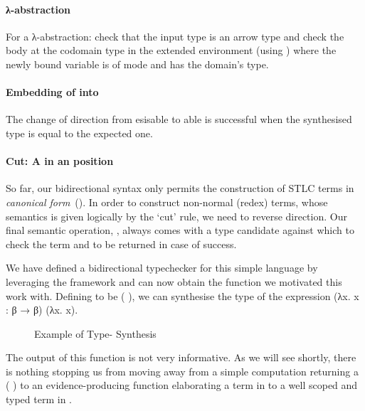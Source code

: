 \paragraph{λ-abstraction} For a λ-abstraction: check that the input
type  is an arrow type and check the body  at the
codomain type in the extended environment (using ) where the
newly bound variable is of mode  and has the domain's type.
\begin{agdasnippet}
\end{agdasnippet}
%
\paragraph{Embedding of  into } The change of
direction from esisable to able is successful when the
synthesised type is equal to the expected one.
\begin{agdasnippet}
\end{agdasnippet}
%
\paragraph{Cut: A  in an  position}
So far, our bidirectional syntax only permits the construction
  of STLC terms in \emph{canonical
    form}~(\cite{Pfenning:04,Dunfield:2004:TT:964001.964025}).
  In order to construct
  non-normal (redex) terms, whose semantics is given logically by the
  `cut' rule, we need to reverse direction.
Our final semantic operation, ,
always comes with a type candidate against which to check the term and
to be returned in case of success.
\begin{agdasnippet}
\end{agdasnippet}
%
We have defined a bidirectional typechecker for this simple language by
leveraging the \semrec{} framework and can now obtain the 
function we motivated this work with.
Defining  to be {(  )}, we can synthesise the
type of the expression {(λx. x : β → β) (λx. x)}.

\begin{figure}[h!]
\caption{Example of Type- Synthesis\label{defn:BidiSemantics}}
\end{figure}

The output of this function is not very informative. As we will see shortly,
there is nothing stopping us from moving away from a simple computation
returning a {( )} to an evidence-producing function
elaborating a term in  to a well scoped and typed term in
.
